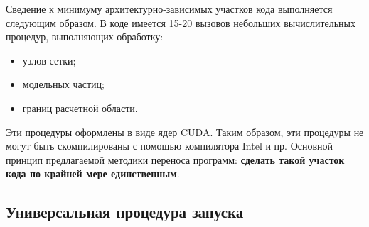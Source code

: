 Сведение к минимуму архитектурно-зависимых участков кода выполняется следующим образом. 
В коде имеется 15-20 вызовов небольших вычислительных процедур, 
выполняющих обработку:
\begin{itemize}
	\item узлов сетки;
	\item модельных частиц;
	\item границ расчетной области.
\end{itemize}
Эти процедуры оформлены в виде ядер CUDA. Таким образом, эти процедуры не могут быть скомпилированы с помощью компилятора Intel и пр.
Основной принцип предлагаемой методики переноса программ: \textbf{сделать такой участок кода по крайней мере единственным}.

\subsection{Универсальная процедура запуска}

